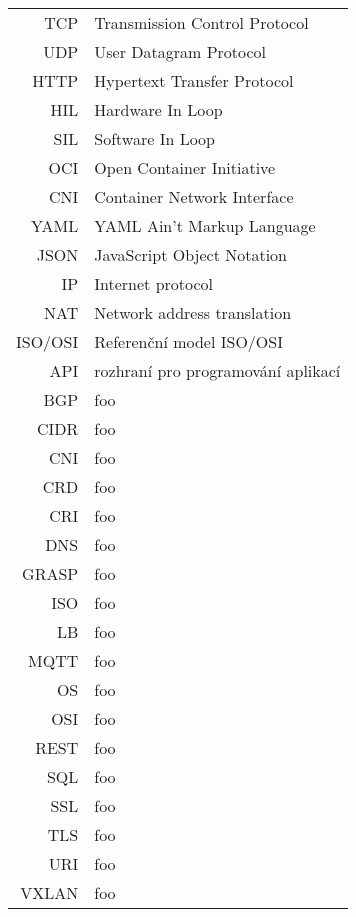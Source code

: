 \begin{tabular}{rl}
TCP & Transmission Control Protocol\\
UDP & User Datagram Protocol\\
HTTP & Hypertext Transfer Protocol\\
HIL & Hardware In Loop\\
SIL & Software In Loop\\
OCI & Open Container Initiative\\
CNI & Container Network Interface\\
YAML & YAML Ain't Markup Language\\
JSON & JavaScript Object Notation \\
IP & Internet protocol\\
NAT & Network address translation\\
ISO/OSI & Referenční model ISO/OSI\\
API & rozhraní pro programování aplikací\\
BGP & foo\\
CIDR & foo\\
CNI & foo\\
CRD & foo\\
CRI & foo\\
DNS & foo\\
GRASP & foo\\
ISO & foo\\
LB & foo\\
MQTT & foo\\
OS & foo\\
OSI & foo\\
REST & foo\\
SQL & foo\\
SSL & foo\\
TLS & foo\\
URI & foo\\
VXLAN & foo\\
\end{tabular}